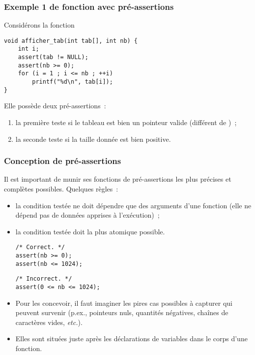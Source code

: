 \begin{frame}[fragile] 
    \frametitle{Exemple 1 de fonction avec pré-assertions}
Considérons la fonction
\begin{lstlisting}
void afficher_tab(int tab[], int nb) {
    int i;
    assert(tab != NULL);
    assert(nb >= 0);
    for (i = 1 ; i <= nb ; ++i)
        printf("%d\n", tab[i]);
}
\end{lstlisting}

Elle possède deux pré-assertions~:

\begin{enumerate}
    \item la première teste si le tableau  est bien un pointeur
    valide (différent de )~;
    \smallskip
    
    \item la seconde teste si la taille  donnée est bien 
    positive.
\end{enumerate}
\end{frame}

\begin{frame}[fragile] \frametitle{Conception de pré-assertions}
Il est important de \alert{munir ses fonctions de pré-assertions} les 
plus précises et complètes possibles. Quelques règles~:

\begin{itemize}
    \item la condition testée ne doit dépendre que des arguments d'une 
    fonction (elle ne dépend pas de données apprises à l'exécution)~;
    \smallskip
    
    \item la condition testée doit la plus atomique possible.
    \begin{multicols}{2}
        \begin{lstlisting}
/* Correct. */
assert(nb >= 0);
assert(nb <= 1024);
        \end{lstlisting}
  
        \begin{lstlisting}
/* Incorrect. */
assert(0 <= nb <= 1024);
        \end{lstlisting}
    \end{multicols}
    \smallskip
    
    \item Pour les concevoir, il faut imaginer les pires cas possibles
    à capturer qui peuvent survenir (p.ex., pointeurs nuls, quantités
    négatives, chaînes de caractères vides, {\em etc.}).
    \smallskip
    
    \item Elles sont situées juste après les déclarations de variables
    dans le corps d'une fonction.
\end{itemize}
\end{frame}

